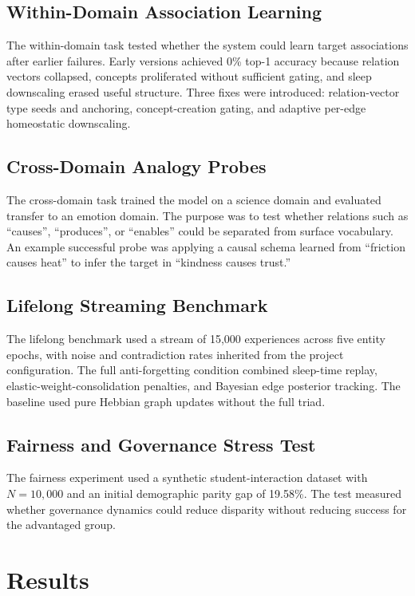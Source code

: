 \documentclass[11pt]{article}
\begin{document}
\subsection{Within-Domain Association Learning}
The within-domain task tested whether the system could learn target associations after earlier failures. Early versions achieved 0\% top-1 accuracy because relation vectors collapsed, concepts proliferated without sufficient gating, and sleep downscaling erased useful structure. Three fixes were introduced: relation-vector type seeds and anchoring, concept-creation gating, and adaptive per-edge homeostatic downscaling.

\subsection{Cross-Domain Analogy Probes}
The cross-domain task trained the model on a science domain and evaluated transfer to an emotion domain. The purpose was to test whether relations such as ``causes'', ``produces'', or ``enables'' could be separated from surface vocabulary. An example successful probe was applying a causal schema learned from ``friction causes heat'' to infer the target in ``kindness causes trust.''

\subsection{Lifelong Streaming Benchmark}
The lifelong benchmark used a stream of 15,000 experiences across five entity epochs, with noise and contradiction rates inherited from the project configuration. The full anti-forgetting condition combined sleep-time replay, elastic-weight-consolidation penalties, and Bayesian edge posterior tracking. The baseline used pure Hebbian graph updates without the full triad.

\subsection{Fairness and Governance Stress Test}
The fairness experiment used a synthetic student-interaction dataset with $N=10{,}000$ and an initial demographic parity gap of 19.58\%. The test measured whether governance dynamics could reduce disparity without reducing success for the advantaged group.

\section{Results}
\end{document}
